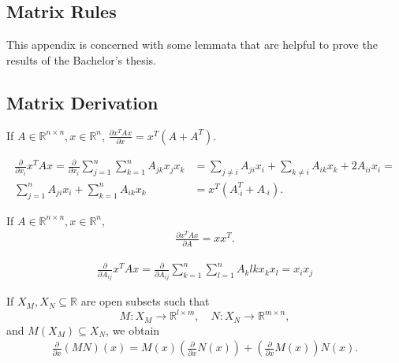 \documentclass[a4paper,11pt]{report}
\begin{document}
\begin{appendix}
\chapter{Matrix Rules}
This appendix is concerned with some lemmata that are helpful to prove the results of the Bachelor's thesis.
\section{Matrix Derivation}\label{ch:matrix-derivation}
\begin{Lem}\label{derivation-quadratic-form}
If $A\in\mathbb{R}^{n\times n},x\in\mathbb{R}^n$, $\frac{\partial x^TAx}{\partial x}=x^T(A+A^T)$.
\end{Lem}

\begin{Bew}
\begin{align*}
\frac{\partial}{\partial x_i}x^TAx=\frac{\partial}{\partial x_i}\sum_{j=1}^n\sum_{k=1}^nA_{jk}x_jx_k&=\sum_{j\ne i}A_{ji}x_i+\sum_{k\ne i}A_{ik}x_k+2A_{ii}x_i=\\
\sum_{j=1}^nA_{ji}x_i+\sum_{k=1}^nA_{ik}x_k&=x^T(A_{\cdot i}^T+A_{\cdot i}).
\end{align*}
\end{Bew}

\begin{Lem}\label{derivation-matrix-quadratic-form}
If $A\in\mathbb{R}^{n\times n},x\in\mathbb{R}^n$,
\begin{align*}
\frac{\partial x^TAx}{\partial A}=xx^T.
\end{align*}
\end{Lem}

\begin{Bew}
\begin{align*}
\frac{\partial}{\partial{A_{ij}}}x^TAx=\frac{\partial}{\partial{A_{ij}}}\sum_{k=1}^n\sum_{l=1}^nA_klkx_kx_l=x_ix_j
\end{align*}
\end{Bew}

\begin{Lem}\label{product-rule}
If $X_M,X_N\subseteq\mathbb{R}$ are open subsets such that
\[
M:X_M\to\mathbb{R}^{l\times m},
\quad
N:X_N\to\mathbb{R}^{m\times n},
\]
and $M(X_M)\subseteq X_N$, we obtain
\begin{align*}
\frac{\partial}{\partial x}(MN)(x)=M(x)\left(\frac{\partial}{\partial x}N(x)\right)+\left(\frac{\partial}{\partial x}M(x)\right)N(x).
\end{align*}
\end{Lem}


\end{appendix}
\end{document}
